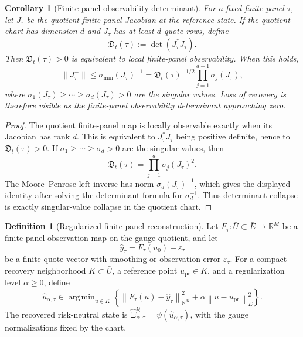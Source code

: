 \documentclass[11pt,a4paper]{amsart}
\theoremstyle{plain}
\newtheorem{corollary}[theorem]{Corollary}
\theoremstyle{definition}
\newtheorem{definition}[theorem]{Definition}
\theoremstyle{remark}
\DeclareMathOperator{\argmin}{arg\,min}
\newcommand{\R}{\mathbb{R}}
\newcommand{\QQ}{\mathbb{Q}}
\newcommand{\eps}{\varepsilon}
\newcommand{\norm}[1]{\left\lVert #1\right\rVert}
\begin{document}
\begin{corollary}[Finite-panel observability determinant]\label{cor:observability-determinant}
For a fixed finite panel \(\tau\), let \(J_\tau\) be the quotient finite-panel Jacobian at the
reference state.  If the quotient chart has dimension \(d\) and \(J_\tau\) has at least \(d\)
quote rows, define
\[
        \mathfrak D_t(\tau):=\det(J_\tau^\ast J_\tau).
\]
Then \(\mathfrak D_t(\tau)>0\) is equivalent to local finite-panel observability.  When this
holds,
\[
        \norm{J_\tau^{-}}
        \le
        \sigma_{\min}(J_\tau)^{-1}
        =
        \mathfrak D_t(\tau)^{-1/2}
        \prod_{j=1}^{d-1}\sigma_j(J_\tau),
\]
where \(\sigma_1(J_\tau)\ge\cdots\ge\sigma_d(J_\tau)>0\) are the singular values.  Loss of
recovery is therefore visible as the finite-panel observability determinant approaching zero.
\end{corollary}

\begin{proof}
The quotient finite-panel map is locally observable exactly when its Jacobian has rank \(d\).  This
is equivalent to \(J_\tau^\ast J_\tau\) being positive definite, hence to
\(\mathfrak D_t(\tau)>0\).  If \(\sigma_1\ge\cdots\ge\sigma_d>0\) are the singular values, then
\[
        \mathfrak D_t(\tau)
        =
        \prod_{j=1}^d\sigma_j(J_\tau)^2.
\]
The Moore--Penrose left inverse has norm \(\sigma_d(J_\tau)^{-1}\), which gives the displayed
identity after solving the determinant formula for \(\sigma_d^{-1}\).  Thus determinant collapse is
exactly singular-value collapse in the quotient chart.
\end{proof}


\begin{definition}[Regularized finite-panel reconstruction]\label{def:regularized-panel-reconstruction}
Let \(F_\tau:\bar U\subset\bar E\to\R^M\) be a finite-panel observation map on the
gauge quotient, and let
\[
        \widehat y_\tau=F_\tau(u_0)+\eps_\tau
\]
be a finite quote vector with smoothing or observation error \(\eps_\tau\).  For a compact
recovery neighborhood \(K\subset\bar U\), a reference point \(u_{\mathrm{pr}}\in K\), and a
regularization level \(\alpha\ge0\), define
\[
        \widehat u_{\alpha,\tau}
        \in
        \argmin_{u\in K}
        \left\{
        \norm{F_\tau(u)-\widehat y_\tau}_{\R^M}^2
        +
        \alpha\norm{u-u_{\mathrm{pr}}}_{\bar E}^2
        \right\}.
\]
The recovered risk-neutral state is \(\widehat\Xi_{\alpha,\tau}^\QQ=\psi(\widehat u_{\alpha,\tau})\),
with the gauge normalizations fixed by the chart.
\end{definition}
\end{document}
